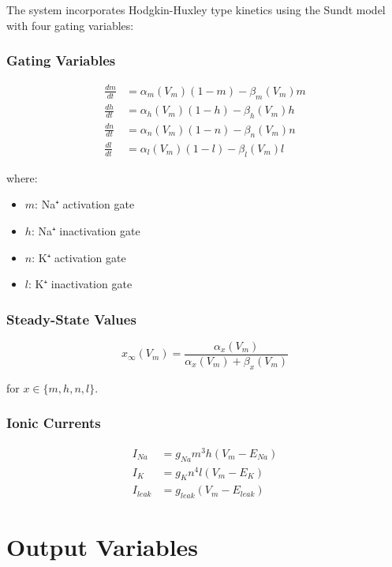 \documentclass[11pt,a4paper]{article}
\begin{document}
The system incorporates Hodgkin-Huxley type kinetics using the Sundt model with four gating variables:

\subsubsection{Gating Variables}

\begin{align}
\frac{dm}{dt} &= \alpha_m(V_m)(1-m) - \beta_m(V_m)m \\
\frac{dh}{dt} &= \alpha_h(V_m)(1-h) - \beta_h(V_m)h \\
\frac{dn}{dt} &= \alpha_n(V_m)(1-n) - \beta_n(V_m)n \\
\frac{dl}{dt} &= \alpha_l(V_m)(1-l) - \beta_l(V_m)l
\end{align}

where:
\begin{itemize}
    \item $m$: Na⁺ activation gate
    \item $h$: Na⁺ inactivation gate  
    \item $n$: K⁺ activation gate
    \item $l$: K⁺ inactivation gate
\end{itemize}

\subsubsection{Steady-State Values}

\begin{equation}
x_\infty(V_m) = \frac{\alpha_x(V_m)}{\alpha_x(V_m) + \beta_x(V_m)}
\end{equation}

for $x \in \{m, h, n, l\}$.

\subsubsection{Ionic Currents}

\begin{align}
I_{Na} &= g_{Na} m^3 h (V_m - E_{Na}) \\
I_{K} &= g_{K} n^4 l (V_m - E_K) \\
I_{leak} &= g_{leak} (V_m - E_{leak})
\end{align}

\section{Output Variables}
\end{document}
